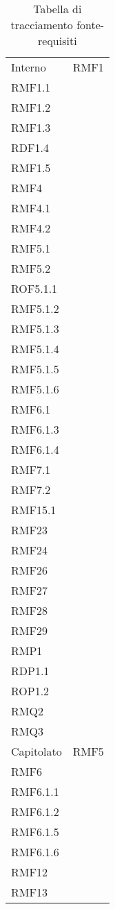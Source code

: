 \setlength{\tabcolsep}{10pt}
\begin{longtable}[h!] { >{\centering}m{5cm} >{\centering}m{5cm} }
	\caption{Tabella di tracciamento fonte-requisiti} \\
	\rowcolor{lightgray}
	\thead{Fonte} & \thead{Requisiti} \\ \endhead%
	
	
	 Interno & RMF1 \\
	 RMF1.1 \\
	 RMF1.2 \\
	 RMF1.3 \\
	 RDF1.4 \\
	 RMF1.5 \\
	 RMF4 \\
	 RMF4.1 \\
	 RMF4.2 \\
	 RMF5.1 \\
	 RMF5.2 \\
	 ROF5.1.1 \\
	 RMF5.1.2 \\
	 RMF5.1.3 \\
	 RMF5.1.4 \\
	 RMF5.1.5 \\
	 RMF5.1.6 \\
	 RMF6.1 \\
	 RMF6.1.3 \\
	 RMF6.1.4 \\
	 RMF7.1 \\
	 RMF7.2 \\
	 RMF15.1 \\
	 RMF23 \\
	 RMF24 \\
	 RMF26 \\
	 RMF27 \\
	 RMF28 \\
	 RMF29 \\ 
	 RMP1 \\
	 RDP1.1 \\
	 ROP1.2 \\
	 RMQ2 \\
	 RMQ3 
	 \tabularnewline
	 Capitolato & RMF5 \\
	 RMF6 \\
	 RMF6.1.1\\
	 RMF6.1.2 \\
	 RMF6.1.5 \\
	 RMF6.1.6 \\
	 RMF12 \\
	 RMF13 \\

\end{longtable}

